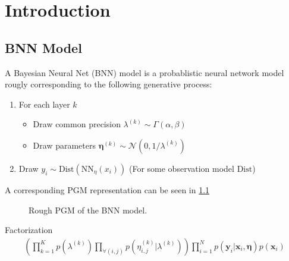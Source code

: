\chapter{Introduction}

\section{BNN Model}

A Bayesian Neural Net (BNN) model is a probablistic neural network model rougly corresponding to the following generative process:
\begin{enumerate}
    \item For each layer $k$
    \begin{itemize}
        \item Draw common precision $\lambda^{(k)}\sim \Gamma(\alpha, \beta)$
        \item Draw parameters $\bm\eta^{(k)} \sim \mathcal N(0, 1/\lambda^{(k)})$
    \end{itemize}
    \item Draw $y_i \sim \text{Dist}(\text{NN}_\eta(x_i))$ (For some observation model $\text{Dist}$)
\end{enumerate}
A corresponding PGM representation can be seen in \cref{bnn-pgm} 

\begin{figure}[htbp]
    \centering
    \caption{Rough PGM of the BNN model.}
    \label{bnn-pgm}
\end{figure}
Factorization
\begin{align*}
    \left(\prod_{k=1}^K  p(\lambda^{(k)}) \prod_{\forall (i,j)} p(\eta_{i,j}^{(k)}|\lambda^{(k)})  \right) 
    \prod_{i=1}^N p(\bm y_i | \bm x_i, \bm \eta) p(\bm x_i)
\end{align*}


